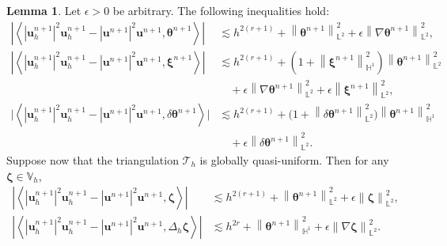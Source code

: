 \documentclass[11pt, reqno]{amsart}
\theoremstyle{definition}
\newtheorem{lemma}[theorem]{Lemma}
\theoremstyle{remark}
\numberwithin{equation}{section}
\newcommand{\bff}{\boldsymbol}
\newcommand{\bb}{\mathbb}
\newcommand{\norm}[2]{\left\|{#1}\right\|_{#2}}
\newcommand{\inpro}[2]{\left\langle#1,#2\right\rangle}
\newcommand{\abs}[1]{\left|{#1}\right|}
\begin{document}
\begin{lemma}\label{lem:cub disc euler}
	Let $\epsilon>0$ be arbitrary. The following inequalities hold:
	\begin{align}\label{equ:uh2uh theta disc euler}
		\left| \inpro{\abs{\bff{u}_h^{n+1}}^2 \bff{u}_h^{n+1}  - \abs{\bff{u}^{n+1}}^2 \bff{u}^{n+1}}{\bff{\theta}^{n+1}} \right| 
		&\lesssim
		h^{2(r+1)} + \norm{\bff{\theta}^{n+1}}{\bb{L}^2}^2 
		+ \epsilon \norm{\nabla \bff{\theta}^{n+1}}{\bb{L}^2}^2,
		\\
		\nonumber
		\label{equ:uh2uh xi disc euler}
		\left| \inpro{\abs{\bff{u}_h^{n+1}}^2 \bff{u}_h^{n+1}  - \abs{\bff{u}^{n+1}}^2 \bff{u}^{n+1}}{\bff{\xi}^{n+1}} \right| 
		&\lesssim
		h^{2(r+1)}  
		+ \left( 1+\norm{\bff{\xi}^{n+1}}{\bb{H}^1}^2 \right) \norm{\bff{\theta}^{n+1}}{\bb{L}^2}^2 
		\\
		&\quad
		+ \epsilon \norm{\nabla \bff{\theta}^{n+1}}{\bb{L}^2}^2
		+ \epsilon \norm{\bff{\xi}^{n+1}}{\bb{L}^2}^2,
		\\
		\label{equ:uh2uh dt theta euler}
		\nonumber
		\big| \inpro{\abs{\bff{u}_h^{n+1}}^2 \bff{u}_h^{n+1}  - \abs{\bff{u}^{n+1}}^2 \bff{u}^{n+1}}{\delta \bff{\theta}^{n+1}} \big|
		&\lesssim
		h^{2(r+1)}
		+
		\big( 1+\norm{\delta \bff{\theta}^{n+1}}{\bb{L}^2}^2 \big) \norm{\bff{\theta}^{n+1}}{\bb{H}^1}^2  
		\\
		&\quad
		+ 
		\epsilon \norm{\delta \bff{\theta}^{n+1}}{\bb{L}^2}^2.
	\end{align}
	Suppose now that the triangulation $\mathcal{T}_h$ is globally quasi-uniform. Then for any $\bff{\zeta}\in \bb{V}_h$,
	\begin{align}\label{equ:psi xi disc euler}
		\left| \inpro{\abs{\bff{u}_h^{n+1}}^2 \bff{u}_h^{n+1}  - \abs{\bff{u}^{n+1}}^2 \bff{u}^{n+1}}{\bff{\zeta}} \right| 
		&\lesssim
		h^{2(r+1)}  + \norm{\bff{\theta}^{n+1}}{\bb{L}^2}^2 
		+ \epsilon \norm{\bff{\zeta}}{\bb{L}^2}^2,
		\\
		\label{equ:psi xi Delta euler}
		\left| \inpro{\abs{\bff{u}_h^{n+1}}^2 \bff{u}_h^{n+1}  - \abs{\bff{u}^{n+1}}^2 \bff{u}^{n+1}}{\Delta_h \bff{\zeta}} \right|
		&\lesssim
		h^{2r} + \norm{\bff{\theta}^{n+1}}{\bb{H}^1}^2
		+
		\epsilon \norm{\nabla \bff{\zeta}}{\bb{L}^2}^2.
	\end{align}
\end{lemma}
\end{document}
